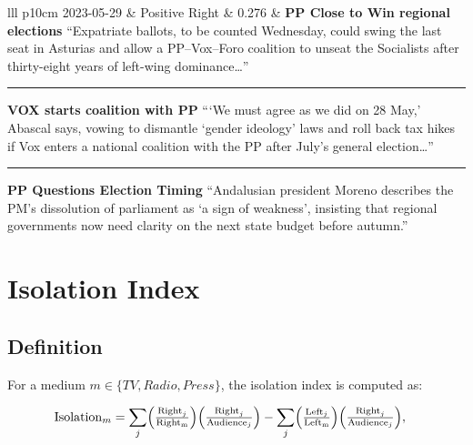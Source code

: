 \documentclass[12pt]{article}
\begin{document}
\begin{center}
\begin{longtable}{lll p{10cm}}
			2023-05-29 & Positive Right & 0.276 &
			\textbf{PP Close to Win regional elections}\newline
			{\scriptsize“Expatriate ballots, to be counted Wednesday, could swing the last seat in Asturias and allow a PP–Vox–Foro coalition to unseat the Socialists after thirty-eight years of left-wing dominance…”}\par\noindent\rule{\linewidth}{0.4pt}\par
			\textbf{VOX starts coalition with PP}\newline
			{\scriptsize“‘We must agree as we did on 28 May,’ Abascal says, vowing to dismantle ‘gender ideology’ laws and roll back tax hikes if Vox enters a national coalition with the PP after July’s general election…”}\par\noindent\rule{\linewidth}{0.4pt}\par
			\textbf{PP Questions Election Timing}\newline
			{\scriptsize“Andalusian president Moreno describes the PM’s dissolution of parliament as ‘a sign of weakness’, insisting that regional governments now need clarity on the next state budget before autumn.”} \\
			\hline
				\caption*{\small \textit{Note:} The table shows days with highest increase in news production between midday and night editions for each content type together with the stories of that type that appeared on  EFE between the two editions. Texts shortened, translated to English, and headlines created with the help of ChatGPT.}
			\label{tab:within}
		\end{longtable}
	\end{center}
	
	
	
	


\newpage



\section{Isolation Index }
\label{sec:isolation}

\subsection{Definition}

For a medium $m\in \{TV,Radio,Press\}$, the isolation index is computed as:


\begin{equation}\label{eq:isolation}
	\begin{aligned}
		& \mathrm{Isolation}_m=%
		\sum_{j}
		\Bigl(\tfrac{\mathrm{Right}_j}{\mathrm{Right_m}}\Bigr)
		\Bigl(\tfrac{\mathrm{Right}_j}{\mathrm{Audience}_j}\Bigr)
		-
		\sum_{j}
		\Bigl(\tfrac{\mathrm{Left}_j}{\mathrm{Left_m}}\Bigr)
		\Bigl(\tfrac{\mathrm{Right}_j}{\mathrm{Audience}_j}\Bigr),
	\end{aligned}
\end{equation} 
\end{document}
